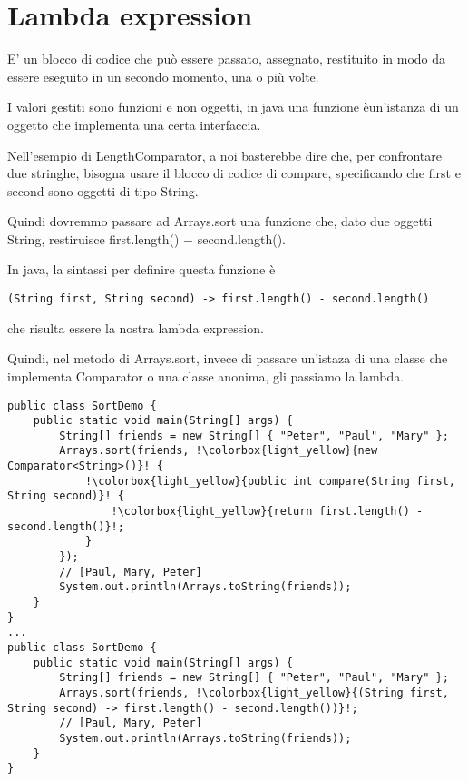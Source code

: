 \chapter{Lambda expression}



E' un blocco di codice che può essere passato, assegnato, restituito in modo da essere eseguito in un secondo momento, una o più volte.

I valori gestiti sono funzioni e non oggetti, in java una funzione èun'istanza di un oggetto che implementa una certa interfaccia.

Nell'esempio di LengthComparator, a noi basterebbe dire che, per confrontare due stringhe, bisogna usare il blocco di codice di compare, specificando che first e 
second sono oggetti di tipo String.

Quindi dovremmo passare ad Arrays.sort una funzione che, dato due oggetti String, restiruisce first.length() $-$ second.length().

In java, la sintassi per definire questa funzione è

\begin{lstlisting}
(String first, String second) -> first.length() - second.length()
\end{lstlisting}

che risulta essere la nostra lambda expression.

Quindi, nel metodo di Arrays.sort, invece di passare un'istaza di una classe che implementa Comparator o una classe anonima, gli passiamo la lambda.
\begin{lstlisting}[escapechar=!]
public class SortDemo {
    public static void main(String[] args) {
        String[] friends = new String[] { "Peter", "Paul", "Mary" };
        Arrays.sort(friends, !\colorbox{light_yellow}{new Comparator<String>()}! { 
            !\colorbox{light_yellow}{public int compare(String first, String second)}! {
                !\colorbox{light_yellow}{return first.length() - second.length()}!;
            }
        });
        // [Paul, Mary, Peter]
        System.out.println(Arrays.toString(friends));
    }
}
... 
public class SortDemo {
    public static void main(String[] args) {
        String[] friends = new String[] { "Peter", "Paul", "Mary" };
        Arrays.sort(friends, !\colorbox{light_yellow}{(String first, String second) -> first.length() - second.length())}!;
        // [Paul, Mary, Peter]
        System.out.println(Arrays.toString(friends));
    }
} 
\end{lstlisting}

